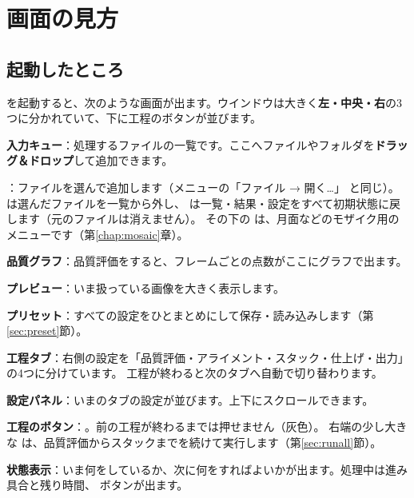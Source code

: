 \chapter{画面の見方}\label{chap:screen}

\section{起動したところ}

\LS を起動すると、次のような画面が出ます。ウインドウは大きく\textbf{左・中央・右}の3つに分かれていて、下に工程のボタンが並びます。


\begin{marklist}
  \item \textbf{入力キュー}：処理するファイルの一覧です。ここへファイルやフォルダを\textbf{ドラッグ＆ドロップ}して追加できます。
  \item {}：ファイルを選んで追加します（メニューの「ファイル → 開く…」 と同じ）。
         は選んだファイルを一覧から外し、 は一覧・結果・設定をすべて初期状態に戻します（元のファイルは消えません）。
        その下の  は、月面などのモザイク用のメニューです（第\ref{chap:mosaic}章）。
  \item \textbf{品質グラフ}：品質評価をすると、フレームごとの点数がここにグラフで出ます。
  \item \textbf{プレビュー}：いま扱っている画像を大きく表示します。
  \item \textbf{プリセット}：すべての設定をひとまとめにして保存・読み込みします（第\ref{sec:preset}節）。
  \item \textbf{工程タブ}：右側の設定を「品質評価・アライメント・スタック・仕上げ・出力」の4つに分けています。
        工程が終わると次のタブへ自動で切り替わります。
  \item \textbf{設定パネル}：いまのタブの設定が並びます。上下にスクロールできます。
  \item \textbf{工程のボタン}：。前の工程が終わるまでは押せません（灰色）。
        右端の少し大きな  は、品質評価からスタックまでを続けて実行します（第\ref{sec:runall}節）。
  \item \textbf{状態表示}：いま何をしているか、次に何をすればよいかが出ます。処理中は進み具合と残り時間、 ボタンが出ます。
\end{marklist}

